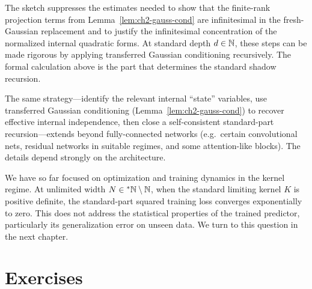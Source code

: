 \begin{remark}\label{rem:ch2-rigor-sketch}
The sketch suppresses the estimates needed to show that the finite-rank projection terms from Lemma~\ref{lem:ch2-gauss-cond} are infinitesimal in the fresh-Gaussian replacement and to justify the infinitesimal concentration of the normalized internal quadratic forms. At standard depth $d \in \mathbb{N}$, these steps can be made rigorous by applying transferred Gaussian conditioning recursively. The formal calculation above is the part that determines the standard shadow recursion.
\end{remark}

\begin{remark}\label{rem:ch2-other-arch}
The same strategy---identify the relevant internal ``state'' variables, use transferred Gaussian conditioning (Lemma~\ref{lem:ch2-gauss-cond}) to recover effective internal independence, then close a self-consistent standard-part recursion---extends beyond fully-connected networks (e.g.\ certain convolutional nets, residual networks in suitable regimes, and some attention-like blocks). The details depend strongly on the architecture.
\end{remark}

We have so far focused on optimization and training dynamics in the kernel regime. At unlimited width $N \in {}^*\mathbb{N} \setminus \mathbb{N}$, when the standard limiting kernel $K$ is positive definite, the standard-part squared training loss converges exponentially to zero. This does not address the statistical properties of the trained predictor, particularly its generalization error on unseen data. We turn to this question in the next chapter.

\section{Exercises}\label{sec:ch2-exercises}

